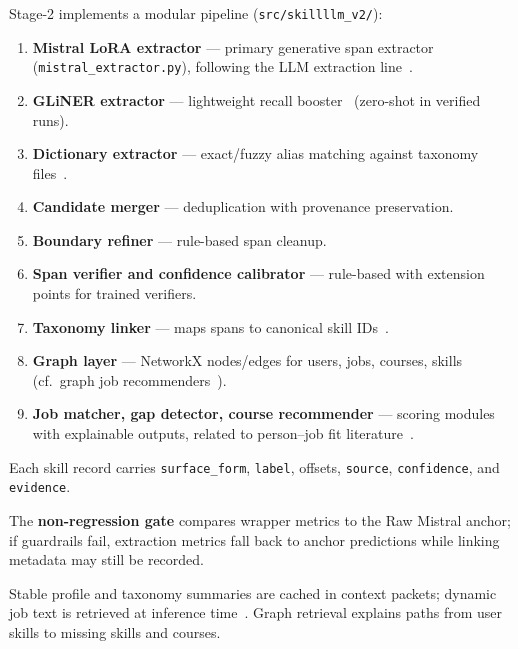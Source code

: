 \documentclass[12pt,oneside]{report}
\begin{document}
Stage-2 implements a modular pipeline (\texttt{src/skillllm\_v2/}):

\begin{enumerate}
  \item \textbf{Mistral LoRA extractor} --- primary generative span extractor (\texttt{mistral\_extractor.py}), following the LLM extraction line~\cite{herandi2024skillllm,nguyen2024rethinking}.
  \item \textbf{GLiNER extractor} --- lightweight recall booster~\cite{zaratiana2023gliner} (zero-shot in verified runs).
  \item \textbf{Dictionary extractor} --- exact/fuzzy alias matching against taxonomy files~\cite{zhao2015skill,clavie2023batteries}.
  \item \textbf{Candidate merger} --- deduplication with provenance preservation.
  \item \textbf{Boundary refiner} --- rule-based span cleanup.
  \item \textbf{Span verifier and confidence calibrator} --- rule-based with extension points for trained verifiers.
  \item \textbf{Taxonomy linker} --- maps spans to canonical skill IDs~\cite{zhang2024entitylinking,levrang2014esco}.
  \item \textbf{Graph layer} --- NetworkX nodes/edges for users, jobs, courses, skills (cf.\ graph job recommenders~\cite{giabelli2021skills2job,goyal2023jobxmlc}).
  \item \textbf{Job matcher, gap detector, course recommender} --- scoring modules with explainable outputs, related to person--job fit literature~\cite{bian2019domain,yu2025confitv2,li2020competence}.
\end{enumerate}

Each skill record carries \texttt{surface\_form}, \texttt{label}, offsets, \texttt{source}, \texttt{confidence}, and \texttt{evidence}.

The \textbf{non-regression gate} compares wrapper metrics to the Raw Mistral anchor; if guardrails fail, extraction metrics fall back to anchor predictions while linking metadata may still be recorded.

Stable profile and taxonomy summaries are cached in context packets; dynamic job text is retrieved at inference time~\cite{lewis2020rag,karpukhin2020dpr,reimers2019sentencebert}.
Graph retrieval explains paths from user skills to missing skills and courses.

\end{document}
